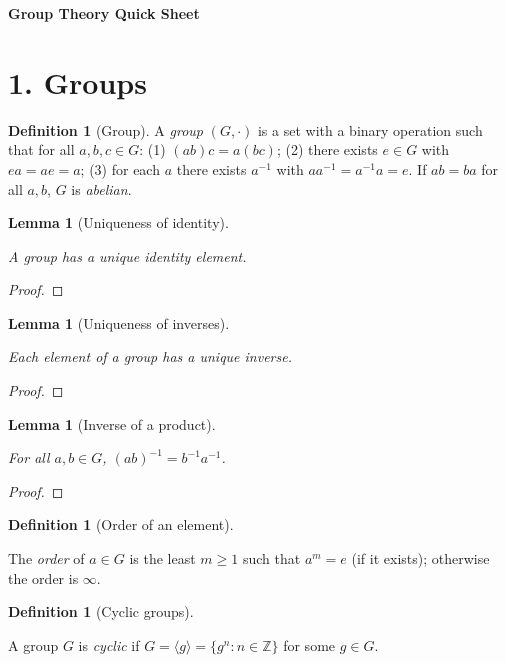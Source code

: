 \documentclass[11pt,letterpaper]{article}
\newtheorem{lemma}[theorem]{Lemma}
\theoremstyle{definition}
\newtheorem{definition}[theorem]{Definition}
\theoremstyle{remark}
\newcommand{\ZZ}{\mathbb{Z}}
\newcommand{\uses}[1]{}
\begin{document}
\begin{center}
  {\Large \textbf{Group Theory Quick Sheet}}\\
  \vspace{2mm}
\end{center}

\section*{1. Groups}

\begin{definition}[Group]\label{def:group}
A \emph{group} $(G,\cdot)$ is a set with a binary operation such that for all $a,b,c\in G$:
(1) $(ab)c=a(bc)$;
(2) there exists $e\in G$ with $ea=ae=a$;
(3) for each $a$ there exists $a^{-1}$ with $aa^{-1}=a^{-1}a=e$. If $ab=ba$ for all $a,b$, $G$ is \emph{abelian}.
\end{definition}

\begin{lemma}[Uniqueness of identity]\label{lem:unique_identity}
\uses{def:group}
A group has a unique identity element.
\end{lemma}
\begin{proof}\end{proof}

\begin{lemma}[Uniqueness of inverses]\label{lem:unique_inverse}
\uses{def:group}
Each element of a group has a unique inverse.
\end{lemma}
\begin{proof}\uses{lem:unique_identity}\end{proof}

\begin{lemma}[Inverse of a product]\label{lem:inverse_product}
\uses{def:group}
For all $a,b\in G$, $(ab)^{-1}=b^{-1}a^{-1}$.
\end{lemma}
\begin{proof}\end{proof}

\begin{definition}[Order of an element]\label{def:order}
\uses{def:group}
The \emph{order} of $a\in G$ is the least $m\ge1$ such that $a^m=e$ (if it exists); otherwise the order is $\infty$.
\end{definition}

\begin{definition}[Cyclic groups]\label{def:cyclic_group}
\uses{def:group}
A group $G$ is \emph{cyclic} if $G=\langle g\rangle=\{g^n:n\in\ZZ\}$ for some $g\in G$.
\end{definition}
\end{document}
